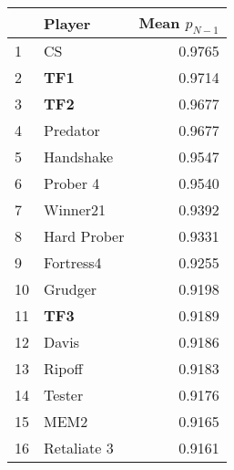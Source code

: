 \begin{tabular}{llr}
\toprule
{} &       Player &  Mean $p_{N-1}$ \\
\midrule
1  &           CS &          0.9765 \\
2  &          \textbf{TF1} &          0.9714 \\
3  &          \textbf{TF2} &          0.9677 \\
4  &     Predator &          0.9677 \\
5  &    Handshake &          0.9547 \\
6  &     Prober 4 &          0.9540 \\
7  &     Winner21 &          0.9392 \\
8  &  Hard Prober &          0.9331 \\
9  &    Fortress4 &          0.9255 \\
10 &      Grudger &          0.9198 \\
11 &          \textbf{TF3} &          0.9189 \\
12 &        Davis &          0.9186 \\
13 &       Ripoff &          0.9183 \\
14 &       Tester &          0.9176 \\
15 &         MEM2 &          0.9165 \\
16 &  Retaliate 3 &          0.9161 \\
\bottomrule
\end{tabular}

